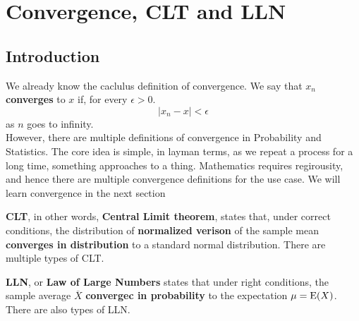 \chapter{Convergence, CLT and LLN}
\section{Introduction}
We already know the caclulus definition of convergence. We say that $x_n$ \textbf{converges} to $x$ if, for every $\epsilon > 0 $.
\[|x_n - x| < \epsilon \]
as $n$ goes to infinity. \\
However, there are multiple definitions of convergence in Probability and Statistics. The core idea is simple, in layman terms, as we repeat a process for a long time, something approaches to a thing. Mathematics requires regirousity, and hence there are multiple convergence definitions for the use case. We will learn convergence in the next section \\
\par
\textbf{CLT}, in other words, \textbf{Central Limit theorem}, states that, under correct conditions, the distribution of \textbf{normalized verison} of the sample mean \textbf{converges in distribution} to a standard normal distribution. There are multiple types of CLT. \\
\par
\textbf{LLN}, or \textbf{Law of Large Numbers} states that under right conditions,  the sample average $\overline{X}$ \textbf{convergec in probability}  to the expectation $\mu = {\operatorname{E}}(X)$. There are also types of LLN.

